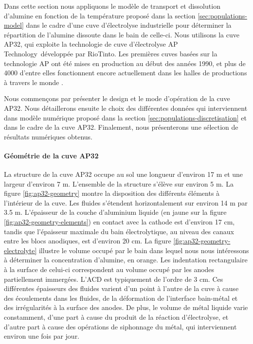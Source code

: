 Dans cette section nous appliquons le modèle de transport et
dissolution d'alumine en fonction de la température proposé dans la
section \ref{sec:populations-model} dans le cadre d'une cuve
d'électrolyse industrielle pour déterminer la répartition de l'alumine
dissoute dans le bain de celle-ci. Nous utilisons la cuve AP32, qui
exploite la technologie de cuve d'électrolyse AP
Technology\texttrademark\ développée par RioTinto. Les premières cuves
basées sur la technologie AP ont été mises en production au début des
années 1990, et plus de \num{4000} d'entre elles fonctionnent encore
actuellement dans les halles de productions à travers le monde
\cite{RiotintoAP30}.

Nous commençons par présenter le design et le mode d'opération de la
cuve AP32. Nous détaillerons ensuite le choix des différentes données
qui interviennent dans modèle numérique proposé dans la section
\ref{sec:populations-discretisation} et dans le cadre de la cuve
AP32. Finalement, nous présenterons une sélection de résultats
numériques obtenus.

\paragraph{Géométrie de la cuve AP32} La structure de la cuve AP32
occupe au sol une longueur d'environ \num{17} \si{\meter} et une
largeur d'environ \num{7} \si{\meter}. L'ensemble de la structure
s'élève sur environ \num{5} \si{\meter}. La figure
\ref{fig:ap32-geometry} montre la disposition des différents éléments
à l'intérieur de la cuve. Les fluides s'étendent horizontalement sur
environ \num{14} \si{\meter} par \num{3.5} \si{\meter}. L'épaisseur de
la couche d'aluminium liquide (en jaune sur la figure
\ref{fig:ap32-geometry-elements}) en contact avec la cathode est
d'environ \num{17} \si{\centi\meter}, tandis que l'épaisseur maximale
du bain électrolytique, au niveau des canaux entre les blocs
anodiques, est d'environ \num{20} \si{\centi\meter}. La figure
\ref{fig:ap32-geometry-electrolyte} illustre le volume occupé par le
bain dans lequel nous nous intéressons à déterminer la concentration
d'alumine, en orange. Les indentation rectangulaire à la surface de
celui-ci correspondent au volume occupé par les anodes partiellement
immergées. L'ACD est typiquement de l'ordre de \num{3}
\si{\centi\meter}. Ces différentes épaisseurs des fluides varient d'un
point à l'autre de la cuve à cause des écoulements dans les fluides,
de la déformation de l'interface bain-métal et des irrégularités à la
surface des anodes. De plus, le volume de métal liquide varie
constamment, d'une part à cause du produit de la réaction
d'électrolyse, et d'autre part à cause des opérations de siphonnage du
métal, qui interviennent environ une fois par jour.

